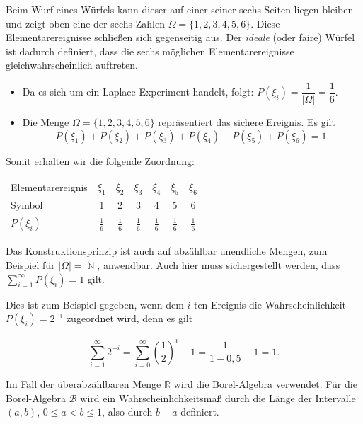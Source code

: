 \begin{beispiel}
Beim Wurf eines Würfels kann dieser auf einer seiner sechs Seiten liegen bleiben und zeigt oben eine der sechs Zahlen $\Omega = \{1,2,3,4,5,6\}$. Diese Elementarereignisse schließen sich gegenseitig aus. Der \textit{ideale} (oder faire) Würfel ist dadurch definiert, dass die sechs möglichen Elementarereignisse gleichwahrscheinlich auftreten.

\begin{itemize}
  \item Da es sich um ein Laplace Experiment handelt, folgt: $P(\xi_i) = \dfrac{1}{|\Omega|} = \dfrac{1}{6}$.
  \item Die Menge $\Omega = \{1,2,3,4,5,6\}$ repräsentiert das sichere Ereignis. Es gilt
$$
P(\xi_1) + P(\xi_2) + P(\xi_3) + P(\xi_4) + P(\xi_5) + P(\xi_6) = 1.
$$
\end{itemize}

Somit erhalten wir die folgende Zuordnung:

\begin{center}
\begin{tabular}{lcccccc}
  \hline
  Elementarereignis & $\xi_1$ & $\xi_2$ & $\xi_3$ & $\xi_4$ & $\xi_5$ & $\xi_6$ \\
  Symbol            & 1 & 2 & 3 & 4 & 5 & 6 \\
  $P(\xi_i)$        & $\frac{1}{6}$ & $\frac{1}{6}$ & $\frac{1}{6}$ & $\frac{1}{6}$ & $\frac{1}{6}$ & $\frac{1}{6}$ \\
  \hline
\end{tabular}
\end{center}
\end{beispiel}

Das Konstruktionsprinzip ist auch auf abzählbar unendliche Mengen, zum Beispiel für $|\Omega| = |\mathbb{N}|$, anwendbar. Auch hier muss sichergestellt werden, dass $\sum_{i=1}^{\infty} P(\xi_i) = 1$ gilt.

Dies ist zum Beispiel gegeben, wenn dem $i$-ten Ereignis die Wahrscheinlichkeit $P(\xi_i) = 2^{-i}$ zugeordnet wird, denn es gilt

$$
\sum_{i=1}^{\infty} 2^{-i} = \sum_{i=0}^{\infty} \left(\frac{1}{2}\right)^i - 1 = \frac{1}{1-0{,}5} - 1 = 1.
$$

Im Fall der überabzählbaren Menge $\mathbb{R}$ wird die Borel-Algebra verwendet. Für die Borel-Algebra $\mathcal{B}$ wird ein Wahrscheinlichkeitsmaß durch die Länge der Intervalle $(a,b)$, $0 \leq a < b \leq 1$, also durch $b - a$ definiert.

